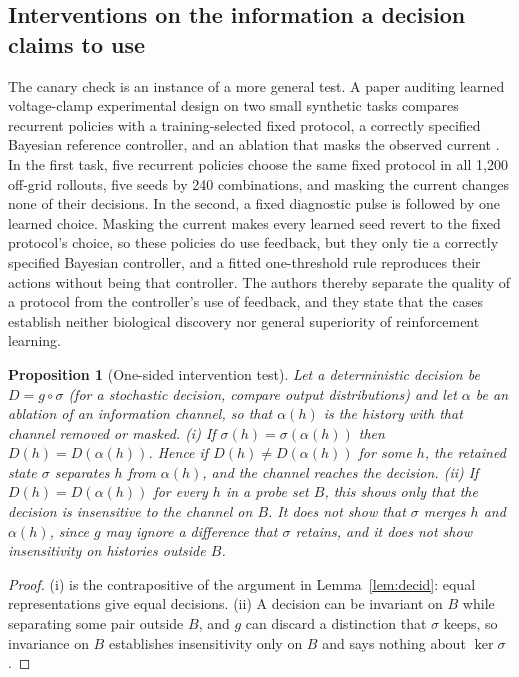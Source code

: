 \documentclass[11pt]{article}
\newtheorem{proposition}{Proposition}
\theoremstyle{definition}
\theoremstyle{remark}
\begin{document}
\subsection{Interventions on the information a decision claims to use}

The canary check is an instance of a more general test. A paper auditing learned voltage-clamp experimental design on two small synthetic tasks compares recurrent policies with a training-selected fixed protocol, a correctly specified Bayesian reference controller, and an ablation that masks the observed current \cite{voltclamp}. In the first task, five recurrent policies choose the same fixed protocol in all 1,200 off-grid rollouts, five seeds by 240 combinations, and masking the current changes none of their decisions. In the second, a fixed diagnostic pulse is followed by one learned choice. Masking the current makes every learned seed revert to the fixed protocol's choice, so these policies do use feedback, but they only tie a correctly specified Bayesian controller, and a fitted one-threshold rule reproduces their actions without being that controller. The authors thereby separate the quality of a protocol from the controller's use of feedback, and they state that the cases establish neither biological discovery nor general superiority of reinforcement learning.

\begin{proposition}[One-sided intervention test]\label{prop:intervention}
Let a deterministic decision be $D=g\circ\sigma$ (for a stochastic decision, compare output distributions) and let $\alpha$ be an ablation of an information channel, so that $\alpha(h)$ is the history with that channel removed or masked. (i) If $\sigma(h)=\sigma(\alpha(h))$ then $D(h)=D(\alpha(h))$. Hence if $D(h)\ne D(\alpha(h))$ for some $h$, the retained state $\sigma$ separates $h$ from $\alpha(h)$, and the channel reaches the decision. (ii) If $D(h)=D(\alpha(h))$ for every $h$ in a probe set $B$, this shows only that the decision is insensitive to the channel on $B$. It does not show that $\sigma$ merges $h$ and $\alpha(h)$, since $g$ may ignore a difference that $\sigma$ retains, and it does not show insensitivity on histories outside $B$.
\end{proposition}

\begin{proof}
(i) is the contrapositive of the argument in Lemma~\ref{lem:decid}: equal representations give equal decisions. (ii) A decision can be invariant on $B$ while separating some pair outside $B$, and $g$ can discard a distinction that $\sigma$ keeps, so invariance on $B$ establishes insensitivity only on $B$ and says nothing about $\ker\sigma$.
\end{proof}
\end{document}
